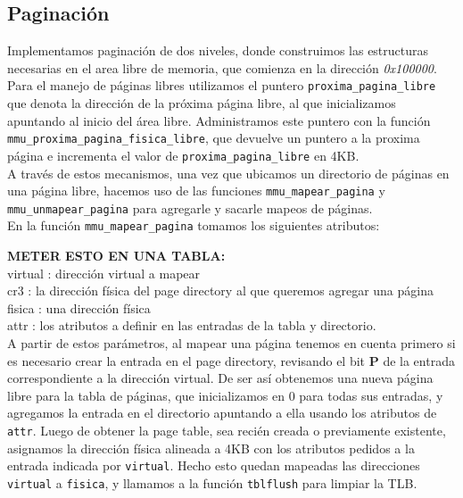 \subsection{Paginación}
\label{sec-paginacion} 

Implementamos paginación de dos niveles, donde construimos las estructuras necesarias en  el area libre de memoria, que comienza en la dirección \textit{0x100000}.\\
Para el manejo de páginas libres utilizamos el puntero \verb|proxima_pagina_libre| que denota la dirección de la próxima página libre, al que inicializamos apuntando al inicio del área libre.
Administramos este puntero con la función \verb|mmu_proxima_pagina_fisica_libre|, que devuelve un puntero a la proxima página e incrementa el valor de \verb|proxima_pagina_libre| en 4KB.\\

A través de estos mecanismos, una vez que ubicamos un directorio de páginas en una página libre, hacemos uso de las funciones \verb|mmu_mapear_pagina| y \verb|mmu_unmapear_pagina| para agregarle y sacarle mapeos de páginas.\\

En la función \verb|mmu_mapear_pagina| tomamos los siguientes atributos:

\textbf{METER ESTO EN UNA TABLA:}\\
virtual :  dirección virtual a mapear\\
cr3 :  la dirección física del page directory al que queremos agregar una página\\
fisica :  una dirección física\\
attr : los atributos a definir en las entradas de la tabla y directorio.\\


A partir de estos parámetros, al mapear una página tenemos en cuenta primero si es necesario crear la entrada en el page directory, revisando el bit \textbf{P} de la entrada correspondiente a la dirección virtual.
De ser así obtenemos una nueva página libre para la tabla de páginas, que inicializamos en 0 para todas sus entradas, y agregamos la entrada en el directorio apuntando a ella usando los atributos de \verb|attr|.
Luego de obtener la page table, sea recién creada o previamente existente, asignamos la dirección física alineada a 4KB con los atributos pedidos a la entrada indicada por \verb|virtual|.
Hecho esto quedan mapeadas las direcciones \verb|virtual| a \verb|fisica|, y llamamos a la función \verb|tblflush| para limpiar la TLB.\\


